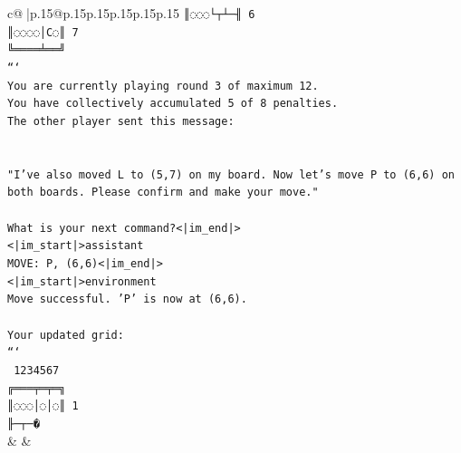 \documentclass{article}
\begin{document}
{\begin{supertabular}{c@{$\;$}|p{.15\linewidth}@{}p{.15\linewidth}p{.15\linewidth}p{.15\linewidth}p{.15\linewidth}p{.15\linewidth}}
{{{\texttt{║◌◌◌└┬┴─╢ 6} \\
\texttt{║◌◌◌◌│C◌║ 7} \\
\texttt{╚════╧══╝} \\
\texttt{```} \\
\texttt{You are currently playing round 3 of maximum 12.} \\
\texttt{You have collectively accumulated 5 of 8 penalties.} \\
\texttt{The other player sent this message:} \\
\\ 
\\ 
\texttt{"I've also moved L to (5,7) on my board. Now let's move P to (6,6) on both boards. Please confirm and make your move."} \\
\\ 
\texttt{What is your next command?<|im\_end|>} \\
\texttt{<|im\_start|>assistant} \\
\texttt{MOVE: P, (6,6)<|im\_end|>} \\
\texttt{<|im\_start|>environment} \\
\texttt{Move successful. 'P' is now at (6,6).} \\
\\ 
\texttt{Your updated grid:} \\
\texttt{```} \\
\texttt{ 1234567} \\
\texttt{╔═══╤═╤═╗} \\
\texttt{║◌◌◌│◌│◌║ 1} \\
\texttt{╟─┬─�} \\
            }
        }
    }
    & & \\ \\


\end{supertabular}}
\end{document}

